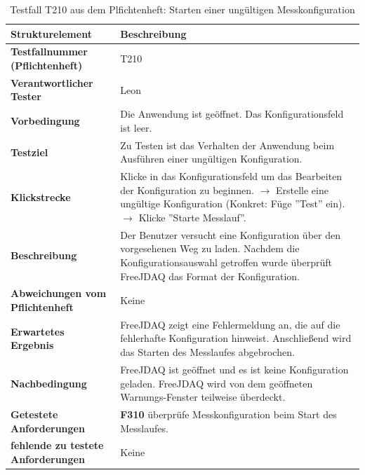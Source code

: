 \documentclass[parskip=full]{scrartcl}
\begin{document}
\begin{table}[h]
    \begin{tabular}{| p{4cm} | p{10cm} |}
        \hline
        \textbf{Strukturelement} & \textbf{Beschreibung} \\ \hline
        \textbf{Testfallnummer (Pflichtenheft)}
        & 
        T210
        \\ \hline
        \textbf{Verantwortlicher Tester}
        & 
        Leon
        \\ \hline
        \textbf{Vorbedingung}
        & 
        Die Anwendung ist geöffnet. Das Konfigurationsfeld ist leer.
        \\ \hline
        \textbf{ Testziel}
        & 
        Zu Testen ist das Verhalten der Anwendung beim Ausführen einer ungültigen Konfiguration.
        \\ \hline
        
        \textbf{Klickstrecke}
        & 
        Klicke in das Konfigurationsfeld um das Bearbeiten der Konfiguration zu beginnen. $\rightarrow$ Erstelle eine ungültige Konfiguration (Konkret: Füge ''Test'' ein). $\rightarrow$ Klicke ''Starte Messlauf''.
        \\ \hline
        
        \textbf{ Beschreibung}
        & 
        Der Benutzer versucht eine Konfiguration über den vorgesehenen Weg zu laden. Nachdem die Konfigurationsauswahl getroffen wurde überprüft FreeJDAQ das Format der Konfiguration.
        \\ \hline
        
        \textbf{Abweichungen vom Pflichtenheft}
        & 
        Keine
        
        \\ \hline
        
        \textbf{Erwartetes Ergebnis}
        & 
        FreeJDAQ zeigt eine Fehlermeldung an, die auf die fehlerhafte Konfiguration hinweist. Anschließend wird das Starten des Messlaufes abgebrochen.
        \\ \hline
        
        \textbf{Nachbedingung}
        & 
        FreeJDAQ ist geöffnet und es ist keine Konfiguration geladen. FreeJDAQ wird von dem geöffneten Warnungs-Fenster teilweise überdeckt.
        \\ \hline
        
        
        \textbf{Getestete Anforderungen}
        & 
        \textbf{F310} überprüfe Messkonfiguration beim Start des Messlaufes.
        \\ \hline
        \textbf{fehlende zu testete Anforderungen}
        & 
        Keine
        \\ \hline
        
        
    \end{tabular}
    \caption{Testfall T210 aus dem Plfichtenheft: Starten einer ungültigen Messkonfiguration}
    \label{testfallT210}
\end{table}
\end{document}
